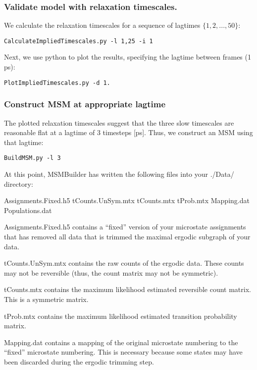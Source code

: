 \documentclass[12pt]{article}
\begin{document}
\subsubsection{Validate model with relaxation timescales.}
We calculate the relaxation timescales for a sequence of lagtimes $\{1, 2, ..., 50\}$:
\begin{verbatim}
CalculateImpliedTimescales.py -l 1,25 -i 1
\end{verbatim}

Next, we use python to plot the results, specifying the lagtime between frames (1 ps):  

\begin{verbatim}
PlotImpliedTimescales.py -d 1. 
\end{verbatim}

\subsubsection{Construct MSM at appropriate lagtime}
The plotted relaxation timescales suggest that the three slow timescales are reasonable flat at a lagtime of 3 timesteps [ps].  Thus, we construct an MSM using that lagtime:

\begin{verbatim}
BuildMSM.py -l 3 
\end{verbatim}



At this point, MSMBuilder has written the following files into your ./Data/ directory:

Assignments.Fixed.h5
tCounts.UnSym.mtx
tCounts.mtx
tProb.mtx
Mapping.dat
Populations.dat

Assignments.Fixed.h5 contains a “fixed” version of your microstate assignments that has removed all data that is trimmed the maximal ergodic subgraph of your data.  

tCounts.UnSym.mtx contains the raw counts of the ergodic data.  These counts may not be reversible (thus, the count matrix may not be symmetric).  

tCounts.mtx contains the maximum likelihood estimated reversible count matrix.  This is a symmetric matrix.  

tProb.mtx contains the maximum likelihood estimated transition probability matrix.  

Mapping.dat contains a mapping of the original microstate numbering to the “fixed” microstate numbering.  This is necessary because some states may have been discarded during the ergodic trimming step.  
\end{document}
